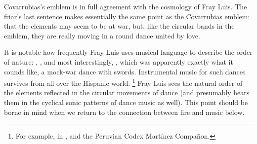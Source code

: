 Covarrubias's emblem is in full agreement with the cosmology of Fray Luis.
The friar's last sentence makes essentially the same point as the Covarrubias emblem: that the elements may seem to be at war, but, like the circular bands in the emblem, they are really moving in a round dance united by love.

It is notable how frequently Fray Luis uses musical language to describe the order of nature: , , and most interestingly, , which was apparently exactly what it sounds like, a mock-war dance with swords.
Instrumental music for such dances survives from all over the Hispanic world.%
	\footnote{%
	For example, in \autocite{MartinyColl:HuertoAmeno}, and the Peruvian Codex Martínez Compañon.
	}
Fray Luis sees the natural order of the elements reflected in the circular movements of dance (and presumably hears them in the cyclical sonic patterns of dance music as well).
This point should be borne in mind when we return to the connection between fire and music below.

